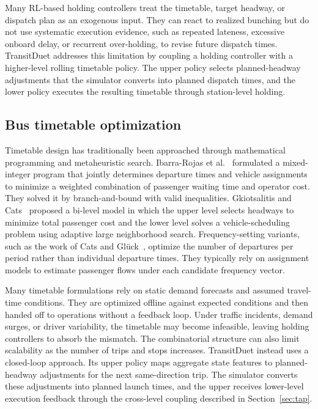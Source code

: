 Many RL-based holding controllers treat the timetable, target headway, or dispatch plan as an exogenous input. They can react to realized bunching but do not use systematic execution evidence, such as repeated lateness, excessive onboard delay, or recurrent over-holding, to revise future dispatch times. TransitDuet addresses this limitation by coupling a holding controller with a higher-level rolling timetable policy. The upper policy selects planned-headway adjustments that the simulator converts into planned dispatch times, and the lower policy executes the resulting timetable through station-level holding.

\subsection{Bus timetable optimization}
\label{subsec:timetable_opt}

Timetable design has traditionally been approached through mathematical programming and metaheuristic search. Ibarra-Rojas et al.~\citep{ibarra2015planning} formulated a mixed-integer program that jointly determines departure times and vehicle assignments to minimize a weighted combination of passenger waiting time and operator cost. They solved it by branch-and-bound with valid inequalities. Gkiotsalitis and Cats~\citep{gkiotsalitis2021bus} proposed a bi-level model in which the upper level selects headways to minimize total passenger cost and the lower level solves a vehicle-scheduling problem using adaptive large neighborhood search. Frequency-setting variants, such as the work of Cats and Gl{\"u}ck~\citep{cats2019frequency}, optimize the number of departures per period rather than individual departure times. They typically rely on assignment models to estimate passenger flows under each candidate frequency vector.

Many timetable formulations rely on static demand forecasts and assumed travel-time conditions. They are optimized offline against expected conditions and then handed off to operations without a feedback loop. Under traffic incidents, demand surges, or driver variability, the timetable may become infeasible, leaving holding controllers to absorb the mismatch. The combinatorial structure can also limit scalability as the number of trips and stops increases. TransitDuet instead uses a closed-loop approach. Its upper policy maps aggregate state features to planned-headway adjustments for the next same-direction trip. The simulator converts these adjustments into planned launch times, and the upper receives lower-level execution feedback through the cross-level coupling described in Section~\ref{sec:tap}.

